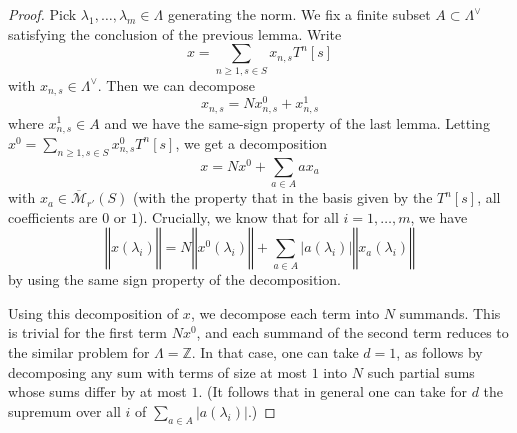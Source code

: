 \begin{proof}
  Pick $\lambda_1,\ldots,\lambda_m\in \Lambda$ generating the norm. We fix a finite subset $A\subset \Lambda^\vee$ satisfying the conclusion of the previous lemma. Write
  \[
  x=\sum_{n\geq 1, s\in S} x_{n,s} T^n [s]
  \]
  with $x_{n,s}\in \Lambda^\vee$. Then we can decompose
  \[
  x_{n,s} = N x_{n,s}^0 + x_{n,s}^1
  \]
  where $x_{n,s}^1\in A$ and we have the same-sign property of the last lemma. Letting $x^0 = \sum_{n\geq 1, s\in S} x_{n,s}^0 T^n [s]$, we get a decomposition
  \[
  x = Nx^0 + \sum_{a\in A} a x_a
  \]
  with $x_a\in \overline{\mathcal M}_{r'}(S)$ (with the property that in the
  basis given by the $T^n [s]$, all coefficients are $0$ or $1$). Crucially,
  we know that for all $i=1,\ldots,m$, we have
  \[
  ‖x(\lambda_i)‖ = N ‖x^0(\lambda_i)‖ + \sum_{a\in A} |a(\lambda_i)| ‖x_a(\lambda_i)‖
  \]
  by using the same sign property of the decomposition.

  Using this decomposition of $x$, we decompose each term into $N$ summands.
  This is trivial for the first term $Nx^0$,
  and each summand of the second term reduces to the similar problem for $\Lambda=\mathbb Z$.
  In that case, one can take $d=1$,
  as follows by decomposing any sum with terms of size at most $1$
  into $N$ such partial sums whose sums differ by at most $1$.
  (It follows that in general one can take for $d$
  the supremum over all $i$ of $\sum_{a\in A} |a(\lambda_i)|$.)
\end{proof}



